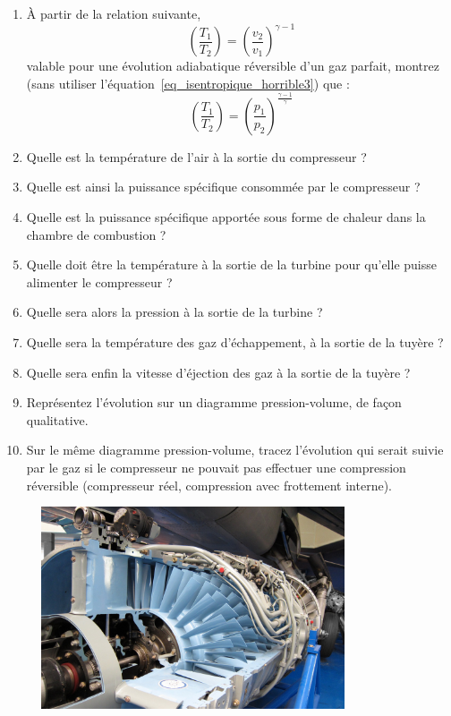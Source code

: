 	\begin{enumerate}
		\item À partir de la relation suivante,
			\begin{equation*}
				\left( \frac{T_1}{T_2} \right)	= \left( \frac{v_2}{v_1} \right)^{\gamma -1}
			\end{equation*}
			valable pour une évolution adiabatique réversible d’un gaz parfait, montrez (sans utiliser l’équation~\ref{eq_isentropique_horrible3}) que :			
			\begin{equation*}
				\left( \frac{T_1}{T_2} \right)	=  \left( \frac{p_1}{p_2} \right)^{\frac{\gamma -1}{\gamma}}
			\end{equation*}
		\item Quelle est la température de l’air à la sortie du compresseur ?
		\item Quelle est ainsi la puissance spécifique consommée par le compresseur ?
		\item Quelle est la puissance spécifique apportée sous forme de chaleur dans la chambre de combustion ?
		\item Quelle doit être la température à la sortie de la turbine pour qu’elle puisse alimenter le compresseur ?
		\item Quelle sera alors la pression à la sortie de la turbine ?
		\item Quelle sera la température des gaz d’échappement, à la sortie de la tuyère ?
		\item Quelle sera enfin la vitesse d’éjection des gaz à la sortie de la tuyère ?
		\item Représentez l’évolution sur un diagramme pression-volume, de façon qualitative.
		\item Sur le même diagramme pression-volume, tracez l’évolution qui serait suivie par le gaz si le compresseur ne pouvait pas effectuer une compression réversible (compresseur réel, compression avec frottement interne).
	\end{enumerate}

	
	\begin{figure}[bth]
		\begin{center}
			\includegraphics[width=0.8\textwidth]{images/atar_compressor.jpg}
		\end{center}
		\label{fig_exo_compresseur_turbojet}
	\end{figure}


